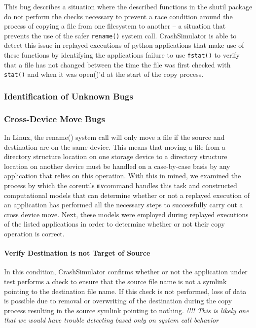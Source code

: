             This bug describes a situation where the described functions in the shutil package do not perform the checks
            necessary to prevent a race condition around the process of copying a file from one filesystem to another --
            a situation that prevents the use of the safer {\tt rename()} system call.  CrashSimulator is able to detect this
            issue in replayed executions of python applications that make use of these functions by identifying the
            applications failure to use {\tt fstat()} to verify that a file has not changed between the time the file was
            first checked with {\tt stat()} and when it was open()'d at the start of the copy process.

        \subsubsection{Identification of Unknown Bugs}

        \subsubsection{Cross-Device Move Bugs}

        In Linux, the rename() system call will only move a file if the source and destination are on the same device.
        This means that moving a file from a directory structure location on one storage device to a directory structure location on
        another device must be handled on a case-by-case basis by any application that relies on this operation.  With
        this in mined, we examined the process by which the coreutils {\tt mv}command handles this task and constructed
        computational models that can determine whether or not a replayed execution of an application has performed all
        the necessary steps to successfully carry out a cross device move.  Next, these models were employed during
        replayed executions of the listed applications in order to determine whether or not their copy operation is correct.

        \paragraph{Verify Destination is not Target of Source}

        In this condition, CrashSimulator confirms whether or not the application under test performs a check to ensure
        that the source file name is not a symlink pointing to the destination file name.  If this check is not
        performed, loss of data is possible due to removal or overwriting of the destination during the copy process
        resulting in the source symlink pointing to nothing. \emph{!!!! This is likely one that we would have trouble
          detecting based only on system call behavior}

